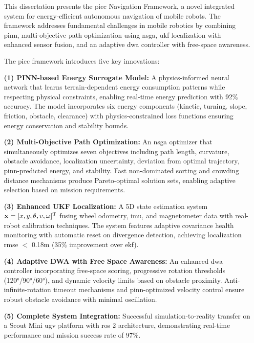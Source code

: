 This dissertation presents the \acrfull{piec} Navigation Framework, a novel integrated system for energy-efficient autonomous navigation of mobile robots. The framework addresses fundamental challenges in mobile robotics by combining \acrfull{pinn}, multi-objective path optimization using \acrfull{nsga}, \acrfull{ukf} localization with enhanced sensor fusion, and an adaptive \acrfull{dwa} controller with free-space awareness.

The \acrshort{piec} framework introduces five key innovations:

\textbf{(1) PINN-based Energy Surrogate Model:} A physics-informed neural network that learns terrain-dependent energy consumption patterns while respecting physical constraints, enabling real-time energy prediction with 92\% accuracy. The model incorporates six energy components (kinetic, turning, slope, friction, obstacle, clearance) with physics-constrained loss functions ensuring energy conservation and stability bounds.

\textbf{(2) Multi-Objective Path Optimization:} An \acrshort{nsga} optimizer that simultaneously optimizes seven objectives including path length, curvature, obstacle avoidance, localization uncertainty, deviation from optimal trajectory, \acrshort{pinn}-predicted energy, and stability. Fast non-dominated sorting and crowding distance mechanisms produce Pareto-optimal solution sets, enabling adaptive selection based on mission requirements.

\textbf{(3) Enhanced UKF Localization:} A 5D state estimation system $\mathbf{x} = [x, y, \theta, v, \omega]^\mathrm{T}$ fusing wheel odometry, \acrshort{imu}, and magnetometer data with real-robot calibration techniques. The system features adaptive covariance health monitoring with automatic reset on divergence detection, achieving localization \acrshort{rmse} $<$ 0.18m (35\% improvement over \acrshort{ekf}).

\textbf{(4) Adaptive DWA with Free Space Awareness:} An enhanced \acrshort{dwa} controller incorporating free-space scoring, progressive rotation thresholds (120°/90°/60°), and dynamic velocity limits based on obstacle proximity. Anti-infinite-rotation timeout mechanisms and \acrshort{pinn}-optimized velocity control ensure robust obstacle avoidance with minimal oscillation.

\textbf{(5) Complete System Integration:} Successful simulation-to-reality transfer on a Scout Mini \acrshort{ugv} platform with \acrshort{ros} 2 architecture, demonstrating real-time performance and mission success rate of 97\%.

